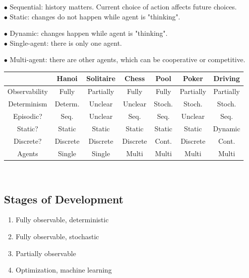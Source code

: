 \documentclass[english,openany]{book}
\begin{document}
    $\bullet$ Sequential: history matters. Current choice of action affects future choices.\\
    
    $\bullet$ Static: changes do not happen while agent is "thinking".
    
    $\bullet$ Dynamic: changes happen while agent is "thinking".\\
    
    $\bullet$ Single-agent: there is only one agent.
    
    $\bullet$ Multi-agent: there are other agents, which can be cooperative or competitive.\\
    
    \begin{tabular}{|c|c|c|c|c|c|c|}
        \hline
        & Hanoi & Solitaire & Chess & Pool & Poker & Driving \\
        \hline
        Observability & Fully & Partially & Fully & Fully & Partially & Partially\\
        Determinism & Determ. & Unclear & Unclear & Stoch. & Stoch. & Stoch.\\
        Episodic? & Seq. & Unclear & Seq. & Seq. & Unclear & Seq.\\
        Static? & Static & Static & Static & Static & Static & Dynamic\\
        Discrete? & Discrete & Discrete & Discrete & Cont. & Discrete & Cont.\\
        Agents & Single & Single & Multi & Multi & Multi & Multi\\
        \hline
    \end{tabular}\\
    
    \subsection{Stages of Development}
    
    \begin{enumerate}
        \item Fully observable, deterministic
    
        \item Fully observable, stochastic
    
        \item Partially observable
    
        \item Optimization, machine learning 
    \end{enumerate}
    
\end{document}
